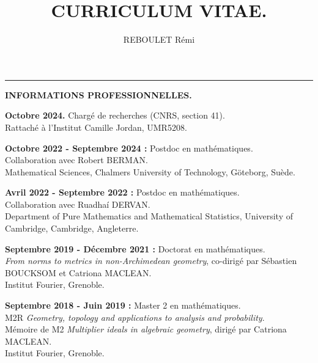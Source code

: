 \documentclass{article}
\author{REBOULET Rémi}
\title{CURRICULUM VITAE.}
\theoremstyle{definition}
\theoremstyle{definition}
\theoremstyle{definition}
\newcommand\bsni{\bigskip\noindent}
\begin{document}




\iffalse \par\noindent\rule{\textwidth}{0.4pt}
\textbf{INFORMATIONS PROFESSIONNELLES.}

\bsni \textbf{Octobre 2024.} Chargé de recherches (CNRS, section 41).\\
Rattaché à l'Institut Camille Jordan, UMR5208.

\bsni \textbf{Octobre 2022 - Septembre 2024 :} Postdoc en mathématiques.\\
Collaboration avec Robert BERMAN.\\
Mathematical Sciences, Chalmers University of Technology, Göteborg, Suède.

\bsni \textbf{Avril 2022 - Septembre 2022 :} Postdoc en mathématiques.\\
Collaboration avec Ruadha\'{i} DERVAN.\\
Department of Pure Mathematics and Mathematical Statistics, University of Cambridge, Cambridge, Angleterre.

\bsni \textbf{Septembre 2019 - Décembre 2021 :} Doctorat en mathématiques.\\
\textit{From norms to metrics in non-Archimedean geometry}, co-dirigé par Sébastien BOUCKSOM et Catriona MACLEAN.\\
Institut Fourier, Grenoble.

\bsni \textbf{Septembre 2018 - Juin 2019 :} Master 2 en mathématiques.\\
M2R \textit{Geometry, topology and applications to analysis and probability}.\\
Mémoire de M2 \textit{Multiplier ideals in algebraic geometry}, dirigé par Catriona MACLEAN.\\
Institut Fourier, Grenoble.
\end{document}
